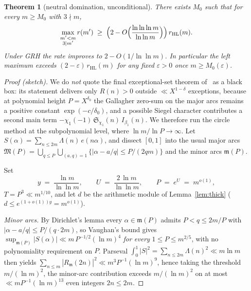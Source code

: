 \documentclass[11pt]{article}
\theoremstyle{plain}
\newtheorem{theorem}{Theorem}[section]
\theoremstyle{definition}
\newcommand{\rch}{r}
\begin{document}
\begin{theorem}[neutral domination, unconditional]
\label{thm:neudom}
There exists $M_0$ such that for every $m \ge M_0$ with
$3 \nmid m$,
\[
\max_{\substack{m' < m \\ 3 \mid m'}} \rch(m')
\;\ge\;
\Bigl(2 - O\Bigl(\frac{\ln\ln\ln m}{\ln\ln m}\Bigr)\Bigr)\,
r_{\mathrm{HL}}(m).
\]
Under GRH the rate improves to $2 - O(1/\ln\ln m)$.
In particular the left
maximum exceeds $(2-\varepsilon)\,r_{\mathrm{HL}}(m)$ for any
fixed $\varepsilon > 0$ once $m \ge M_0(\varepsilon)$.
\end{theorem}

\begin{proof}[Proof (sketch)]
We do \emph{not} quote the final exceptional-set theorem
of~\cite{mv} as a black box: its statement delivers only
$R(n) > 0$ outside $\ll X^{1-\delta}$ exceptions, because at
polynomial height $P = X^{\delta_0}$ the Gallagher zero-sum on the
major arcs remains a positive constant $\exp(-c/\delta_0)$, and a
possible Siegel character contributes a second main term
$-\chi_1(-1)\,\mathfrak{S}_{\chi_1}(n)\,I_{\beta_1}(n)$. We
therefore run the circle method at the subpolynomial level, where
$\ln m/\ln P \to \infty$. Let $S(\alpha) = \sum_{n \le 2m}
\Lambda(n)\,e(n\alpha)$, and dissect $[0,1]$ into the usual major
arcs $\mathfrak{M}(P) = \bigcup_{q \le P}\bigcup_{(a,q)=1}
\{|\alpha - a/q| \le P/(2qm)\}$ and the minor arcs
$\mathfrak{m}(P)$.

Set
\[
y \;=\; \frac{\ln m}{\ln\ln m},
\qquad
U \;=\; \frac{2\,\ln m}{\ln\ln m},
\qquad
P \;=\; e^{U} \;=\; m^{o(1)},
\]
$T = P^{3} \ll m^{1/10}$, and let $d$ be the arithmetic module of
Lemma~\ref{lem:thick} ($d \le e^{(1+o(1))y} = m^{o(1)}$).

\emph{Minor arcs.} By Dirichlet's lemma every
$\alpha \in \mathfrak{m}(P)$ admits $P < q \le 2m/P$ with
$|\alpha - a/q| \le P/(q\cdot 2m)$, so Vaughan's bound
\cite[Theorem~3.1]{vaughan} gives
$\sup_{\mathfrak{m}(P)} |S(\alpha)| \ll m\,P^{-1/2}(\ln m)^{4}$
\emph{for every} $1 \le P \le m^{2/5}$, with no polynomiality
requirement on $P$. Parseval
$\int_0^{1} |S|^{2} = \sum_{n \le 2m} \Lambda(n)^{2} \ll m\ln m$
then yields
$\sum_{n \le m} |R_{\mathfrak{m}}(2n)|^{2} \ll
m^{3}P^{-1}(\ln m)^{9}$, hence taking the threshold
$m/(\ln m)^{2}$, the minor-arc contribution exceeds
$m/(\ln m)^{2}$ on at most
$\ll mP^{-1}(\ln m)^{13}$ even integers $2n \le 2m$.


\end{proof}
\end{document}
